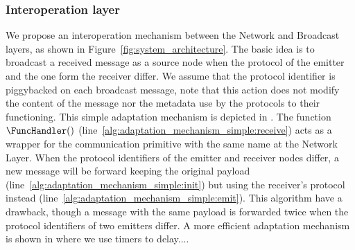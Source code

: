 \subsubsection{Interoperation layer}
We propose an interoperation mechanism between the Network and Broadcast layers, as shown in Figure~\ref{fig:system_architecture}.
%
The basic idea is to broadcast a received message as a source node when the protocol of the emitter and the one form the receiver differ.
%
We assume that the protocol identifier is piggybacked on each broadcast message, note that this action does not modify the content of the message nor the metadata use by the protocols to their functioning.
%
This simple adaptation mechanism is depicted in .
%
The function $\FuncHandler()$ (line~\ref{alg:adaptation_mechanism_simple:receive}) acts as a wrapper for the communication primitive with the same name at the Network Layer.
%
When the protocol identifiers of the emitter and receiver nodes differ, a new message will be forward  keeping the original payload (line~\ref{alg:adaptation_mechanism_simple:init}) but using the receiver's protocol instead (line~\ref{alg:adaptation_mechanism_simple:emit}). This algorithm have a drawback, though a message with the same payload is forwarded twice when the protocol identifiers of two emitters differ.
%
A more efficient adaptation mechanism is shown in  where we use timers to delay....

